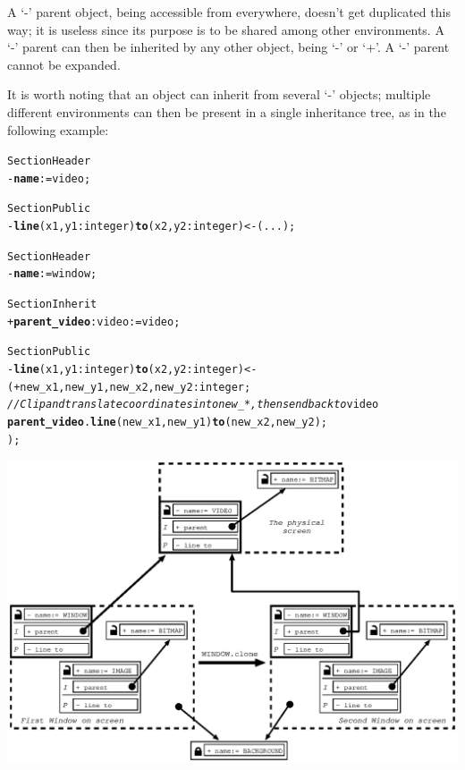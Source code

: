 \documentclass[11pt]{mybook}
\begin{document}
A `-' parent object, being accessible from everywhere, doesn't get
duplicated this way; it is useless since its purpose is to be shared
among other environments.  A `-' parent can then be inherited by any
other object, being `-' or `+'.  A `-' parent cannot be expanded. 

It is worth noting that an object can inherit from several `-'
objects; multiple different environments can then be present in a
single inheritance tree, as in the following example: 

\begin{alltt}
Section Header
  - {\bf{}name} := {\sc{}video};

Section Public
  - {\bf{}line} (x1, y1: {\sc{}integer}) {\bf{}to} (x2, y2: {\sc{}integer}) <- (...);


Section Header
  - {\bf{}name} := {\sc{}window};

Section Inherit
  + {\bf{}parent\_video}:{\sc{}video} := {\sc{}video};

Section Public
  - {\bf{}line} (x1,y1:{\sc{}integer}) {\bf{}to} (x2,y2:{\sc{}integer}) <-
  ( + new_x1, new_y1, new_x2, new_y2: {\sc{}integer};
    {\it{}// Clip and translate coordinates into new\_*, then send back to} {\sc{}video}
    {\bf{}parent\_video}.{\bf{}line} (new_x1, new_y1) {\bf{}to} (new_x2, new_y2);
  );
\end{alltt}

\begin{center}
  \includegraphics{figures/cop-clone.ps}
\end{center}
\end{document}
